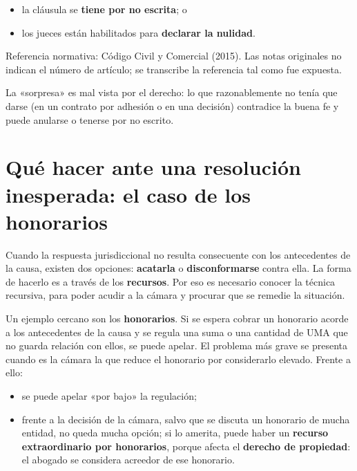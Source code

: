 \documentclass[12pt,oneside]{book}
\begin{document}
\begin{itemize}
    \item la cláusula se \textbf{tiene por no escrita}; o
    \item los jueces están habilitados para \textbf{declarar la nulidad}.
\end{itemize}

\begin{note}
Referencia normativa: Código Civil y Comercial (2015). Las notas originales no indican el número de artículo; se transcribe la referencia tal como fue expuesta.
\end{note}

\begin{important}
La «sorpresa» es mal vista por el derecho: lo que razonablemente no tenía que darse (en un contrato por adhesión o en una decisión) contradice la buena fe y puede anularse o tenerse por no escrito.
\end{important}

\section{Qué hacer ante una resolución inesperada: el caso de los honorarios}

Cuando la respuesta jurisdiccional no resulta consecuente con los antecedentes de la causa, existen dos opciones: \textbf{acatarla} o \textbf{disconformarse} contra ella. La forma de hacerlo es a través de los \textbf{recursos}. Por eso es necesario conocer la técnica recursiva, para poder acudir a la cámara y procurar que se remedie la situación.

Un ejemplo cercano son los \textbf{honorarios}. Si se espera cobrar un honorario acorde a los antecedentes de la causa y se regula una suma o una cantidad de UMA que no guarda relación con ellos, se puede apelar. El problema más grave se presenta cuando es la cámara la que reduce el honorario por considerarlo elevado. Frente a ello:

\begin{itemize}
    \item se puede apelar «por bajo» la regulación;
    \item frente a la decisión de la cámara, salvo que se discuta un honorario de mucha entidad, no queda mucha opción; si lo amerita, puede haber un \textbf{recurso extraordinario por honorarios}, porque afecta el \textbf{derecho de propiedad}: el abogado se considera acreedor de ese honorario.
\end{itemize}
\end{document}
